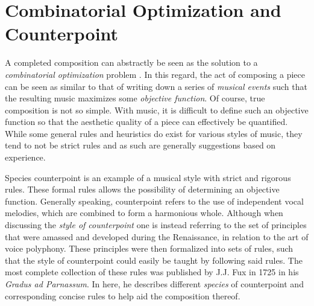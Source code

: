 \documentclass[master.tex]{subfiles} %
\begin{document}
\section{Combinatorial Optimization and Counterpoint}
A completed composition can abstractly be seen as the solution to a \emph{combinatorial optimization} problem . In this regard, the act of composing a piece can be seen as similar to that of writing down a series of \emph{musical events} such that the resulting music maximizes some \emph{objective function}.  Of course, true composition is not so simple. With music, it is difficult to define such an objective function so that the aesthetic quality of a piece can effectively be quantified. While some general rules and heuristics do exist for various styles of music, they tend to not be strict rules and as such are generally suggestions based on experience. 

Species counterpoint is an example of a musical style with strict and rigorous rules. These formal rules allows the possibility of determining an objective function. Generally speaking, counterpoint refers to the use of independent vocal melodies, which are combined to form a harmonious whole. Although when discussing the \emph{style of counterpoint} one is instead referring to the set of principles that were amassed and developed during the Renaissance, in relation to the art of voice polyphony. These principles were then formalized into sets of rules, such that the style of counterpoint could easily be taught by following said rules. The most complete collection of these rules was published by J.J. Fux in 1725 in his \emph{Gradus ad Parnassum}. In here, he describes different \emph{species} of counterpoint and corresponding concise rules to help aid the composition thereof.  
\end{document}

